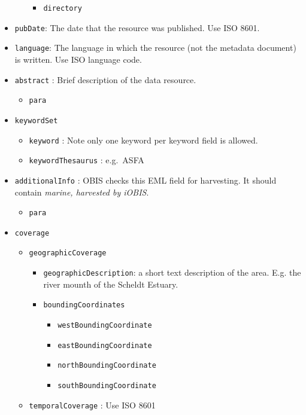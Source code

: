 \documentclass[
  letterpaper,
  DIV=11,
  numbers=noendperiod,
  oneside]{scrreprt}
\providecommand{\tightlist}{%
  \setlength{\itemsep}{0pt}\setlength{\parskip}{0pt}}\usepackage{longtable,booktabs,array}
\begin{document}
\begin{itemize}
\begin{itemize}
    \begin{itemize}
    \tightlist
    \item
      \texttt{directory}
    \end{itemize}
  \end{itemize}
\item
  \texttt{pubDate}: The date that the resource was published. Use ISO
  8601.
\item
  \texttt{language}: The language in which the resource (not the
  metadata document) is written. Use ISO language code.
\item
  \texttt{abstract} : Brief description of the data resource.

  \begin{itemize}
  \tightlist
  \item
    \texttt{para}
  \end{itemize}
\item
  \texttt{keywordSet}

  \begin{itemize}
  \tightlist
  \item
    \texttt{keyword} : Note only one keyword per keyword field is
    allowed.
  \item
    \texttt{keywordThesaurus} : e.g.~ASFA
  \end{itemize}
\item
  \texttt{additionalInfo} : OBIS checks this EML field for harvesting.
  It should contain \emph{marine, harvested by iOBIS}.

  \begin{itemize}
  \tightlist
  \item
    \texttt{para}
  \end{itemize}
\item
  \texttt{coverage}

  \begin{itemize}
  \tightlist
  \item
    \texttt{geographicCoverage}

    \begin{itemize}
    \tightlist
    \item
      \texttt{geographicDescription}: a short text description of the
      area. E.g. the river mounth of the Scheldt Estuary.
    \item
      \texttt{boundingCoordinates}

      \begin{itemize}
      \tightlist
      \item
        \texttt{westBoundingCoordinate}
      \item
        \texttt{eastBoundingCoordinate}
      \item
        \texttt{northBoundingCoordinate}
      \item
        \texttt{southBoundingCoordinate}
      \end{itemize}
    \end{itemize}
  \item
    \texttt{temporalCoverage} : Use ISO 8601


\end{itemize}
\end{itemize}
\end{document}
